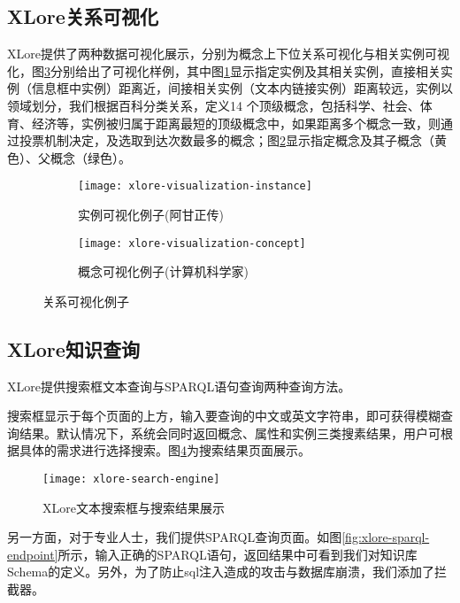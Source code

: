 \subsection{XLore关系可视化}
\label{sec5:xlore-visualization}
XLore提供了两种数据可视化展示，分别为概念上下位关系可视化与相关实例可视化，图\ref{fig:xlore-visualization}分别给出了可视化样例，其中图\ref{fig:xlore-visualization-instance}显示指定实例及其相关实例，直接相关实例（信息框中实例）距离近，间接相关实例（文本内链接实例）距离较远，实例以领域划分，我们根据百科分类关系，定义14 个顶级概念，包括科学、社会、体育、经济等，实例被归属于距离最短的顶级概念中，如果距离多个概念一致，则通过投票机制决定，及选取到达次数最多的概念；图\ref{fig:xlore-visualization-concept}显示指定概念及其子概念（黄色）、父概念（绿色）。

\begin{figure}[ht]
  \centering
  \begin{subfigure}{7.2cm}
    \texttt{[image: xlore-visualization-instance]}
    \caption{实例可视化例子(阿甘正传)}
  \label{fig:xlore-visualization-instance}
  \end{subfigure}
  \hspace{0.01cm}%
  \begin{subfigure}{7.2cm}
    \texttt{[image: xlore-visualization-concept]}
    \caption{概念可视化例子(计算机科学家)}
  \label{fig:xlore-visualization-concept}
  \end{subfigure}
  \caption{关系可视化例子}
  \label{fig:xlore-visualization}
\end{figure}

\subsection{XLore知识查询}
\label{sec5:xlore-knowledge-search}
XLore提供搜索框文本查询与SPARQL语句查询两种查询方法。

搜索框显示于每个页面的上方，输入要查询的中文或英文字符串，即可获得模糊查询结果。默认情况下，系统会同时返回概念、属性和实例三类搜素结果，用户可根据具体的需求进行选择搜索。图\ref{fig:xlore-search-engine}为搜索结果页面展示。

\begin{figure}[ht]
  \centering
  \texttt{[image: xlore-search-engine]}
  \caption{XLore文本搜索框与搜索结果展示}
  \label{fig:xlore-search-engine}
\end{figure}

另一方面，对于专业人士，我们提供SPARQL查询页面。如图\ref{fig:xlore-sparql-endpoint}所示，输入正确的SPARQL语句，返回结果中可看到我们对知识库Schema的定义。另外，为了防止sql注入造成的攻击与数据库崩溃，我们添加了拦截器。

